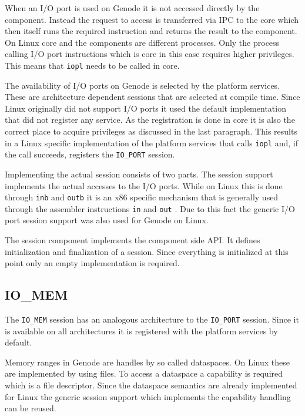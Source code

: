 \documentclass[
a4paper,
12pt,
notitlepage,
parskip=half,
DIV=11,
]{scrbook}
\begin{document}
		When an I/O port is used on Genode it is not accessed directly by the component.
		Instead the request to access is transferred via IPC to the core which then itself runs the required instruction and returns the result to the component.
		On Linux core and the components are different processes.
		Only the process calling I/O port instructions which is core in this case requires higher privileges.
		This means that \texttt{iopl} needs to be called in core.
		
		The availability of I/O ports on Genode is selected by the platform services.
		These are architecture dependent sessions that are selected at compile time.
		Since Linux originally did not support I/O ports it used the default implementation that did not register any service.
		As the registration is done in core it is also the correct place to acquire privileges as discussed in the last paragraph.
		This results in a Linux specific implementation of the platform services that calls \texttt{iopl} and, if the call succeeds, registers the \texttt{IO\_PORT} session.
		
		Implementing the actual session consists of two parts.
		The session support implements the actual accesses to the I/O ports.
		While on Linux this is done through \texttt{inb} and \texttt{outb} \citep{outb} it is an x86 specific mechanism that is generally used through the assembler instructions \texttt{in} and \texttt{out} \citep{intelmanual2}.
		Due to this fact the generic I/O port session support was also used for Genode on Linux.
		
		The session component implements the component side API.
		It defines initialization and finalization of a session.
		Since everything is initialized at this point only an empty implementation is required.
		
		\subsection{IO\_MEM}
		
		The \texttt{IO\_MEM} session has an analogous architecture to the \texttt{IO\_PORT} session.
		Since it is available on all architectures it is registered with the platform services by default.
		
		Memory ranges in Genode are handles by so called dataspaces.
		On Linux these are implemented by using files.
		To access a dataspace a capability is required which is a file descriptor.
		Since the dataspace semantics are already implemented for Linux the generic session support which implements the capability handling can be reused.
		
\end{document}
